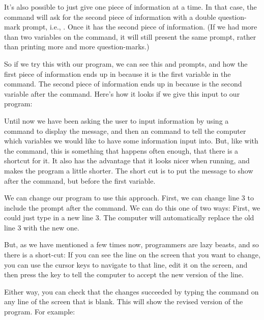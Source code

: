 It's also possible to just give one piece of information at a time.
In that case, the  command will ask for the second piece
of information with a double question-mark prompt, i.e., .
Once it has the second piece of information.  (If we had more than
two variables on the  command, it will still present the
same  prompt, rather than printing more and more
question-marks.)

\needspace{4cm}
So if we try this with our program, we can see this  and
 prompts, and how the first piece of information ends up in
 because it is the first variable in the 
command.
The second piece of information ends up in  because  is
the second variable after the  command. Here's how it
looks if we give this input to our program:



Until now we have been asking the user to input information by using a
 command to display the message, and then an 
command to tell the computer which variables we would like to have
some information input into.  But, like with the  command,
this is something that happens often enough, that there is a shortcut
for it. It also has the advantage that it looks nicer when
running, and makes the program a little shorter. The short cut is to
put the message to show after the  command, but before the
first variable.

We can change our program to use this approach.  First, we can
change line 3 to include the prompt after the  command.  We
can do this one of two ways: First, we could just type in a new line
3. The computer will automatically replace the old line 3 with the new
one.

But, as we have mentioned a few times now, programmers are lazy
beasts, and so there is a short-cut: If you can see the line on the
screen that you want to change, you can use the cursor keys to
navigate to that line, edit it on the screen, and then press the
 key to tell the computer to accept the new version
of the line.

\needspace{4cm}
Either way, you
can check that the changes succeeded by typing the  command
on any line of the screen that is blank.  This will show the revised
version of the program.  For example:

